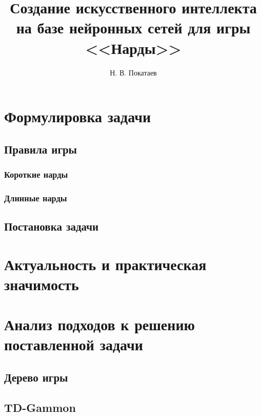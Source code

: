 \documentclass[14pt]{vsciwork}
\title{Создание искусственного интеллекта на базе нейронных сетей для игры <<Нарды>>}
\author{Н. В. Покатаев}
\begin{document}
\maketitle

\tableofcontents



\section{Формулировка задачи}


\subsection{Правила игры}


\subsubsection{Короткие нарды}


\subsubsection{Длинные нарды}


\subsection{Постановка задачи}


\section{Актуальность и практическая значимость}


\section{Анализ подходов к решению поставленной задачи}

\subsection{Дерево игры}


\subsection{TD-Gammon}





\end{document}
